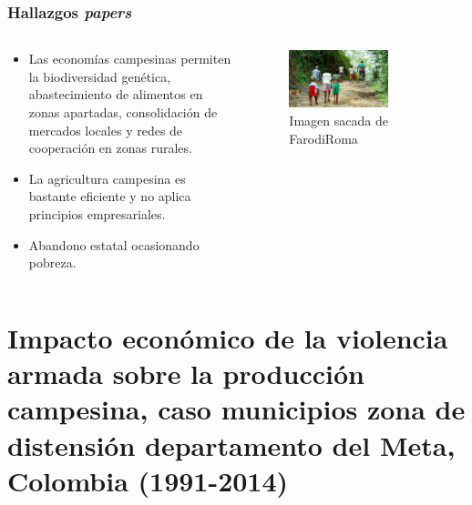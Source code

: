 \documentclass[17pt, t, lualatex]{beamer}
\begin{document}
\begin{frame}[allowframebreaks]
  \frametitle{Hallazgos \textit{papers}}
  
  \begin{columns}
    \begin{column}{.5\textwidth}
      \begin{itemize}
        \item Las economías campesinas permiten la biodiversidad genética,
              abastecimiento de alimentos en zonas apartadas, consolidación de
              mercados locales y redes de cooperación en zonas rurales.              
        \item La agricultura campesina es bastante eficiente y no aplica
              principios empresariales.
        \item Abandono estatal ocasionando pobreza.
      \end{itemize}
    \end{column}

    \begin{column}{.5\textwidth}
      \begin{figure}[ht]
        \centering
        \includegraphics[width=0.7\textwidth]{img/Paper4Fig1.png}
        \caption{\label{fig:p1f1} Imagen sacada de FarodiRoma\cite{farodiroma_choco_2025}}
      \end{figure}

    \end{column}
  \end{columns}

\end{frame}

\section{Impacto económico de la violencia armada sobre la producción campesina,
  caso municipios zona de distensión departamento del Meta, Colombia (1991-2014)}
\end{document}
